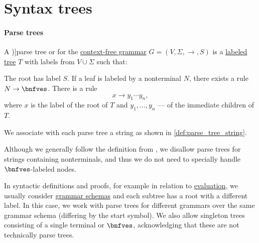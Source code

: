 \section{Syntax trees}\label{sec:syntax_trees}

\paragraph{Parse trees}

\begin{definition}\label{def:parse_tree}
  A \term[ru=дерево вывода (\cite[81]{Гладкий1973ГрамматикиИЯзыки})]{parse tree} or  for the \hyperref[def:chomsky_hierarchy/context_free]{context-free grammar} \( G = (V, \Sigma, \to, S) \) is a \hyperref[def:labeled_tree]{labeled tree} \( T \) with labels from \( V \cup \Sigma \) such that:
  \begin{thmenum}
     The root has label \( S \).
     If a leaf is labeled by a nonterminal \( N \), there exists a rule \( N \to \bnfves \).
     There is a rule
    \begin{equation*}
      x \to y_1 \cdots y_n,
    \end{equation*}
    where \( x \) is the label of the root of \( T \) and \( y_1, \ldots, y_n \) --- of the immediate children of \( T \).
  \end{thmenum}
\end{definition}
\begin{comments}
  \item We associate with each parse tree a string as shown in \cref{def:parse_tree_string}.
  \item Although we generally follow the definition from \cite[\S 2.2.3]{AhoEtAl2006Compilers}, we disallow parse trees for strings containing nonterminals, and thus we do not need to specially handle \( \bnfves \)-labeled nodes.
\end{comments}

\begin{remark}\label{rem:parse_tree_roots}
  In syntactic definitions and proofs, for example in relation to \hyperref[con:evaluation]{evaluation}, we usually consider \hyperref[def:formal_grammar/schema]{grammar schemas} and each subtree has a root with a different label. In this case, we work with parse trees for different grammars over the same grammar schema (differing by the start symbol). We also allow singleton trees consisting of a single terminal or \( \bnfves \), acknowledging that these are not technically parse trees.
\end{remark}

